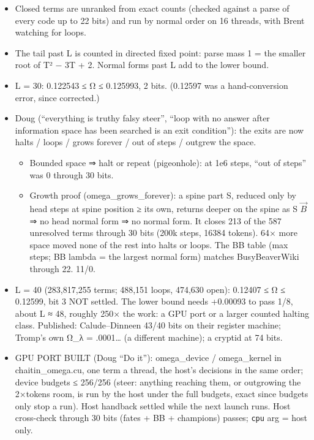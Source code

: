 \begin{enumerate}
\begin{itemize}
\begin{itemize}
\begin{itemize}
\item Closed terms are unranked from exact counts (checked against a parse of every code up to 22 bits) and run by normal order on 16 threads, with Brent watching for loops.
\item The tail past L is counted in directed fixed point: parse mass 1 = the smaller root of T² − 3T + 2. Normal forms past L add to the lower bound.
\item L = 30: 0.122543 ≤ Ω ≤ 0.125993, 2 bits. (0.12597 was a hand-conversion error, since corrected.)
\item Doug (“everything is truthy falsy steer”, “loop with no answer after information space has been searched is an exit condition”): the exits are now halts / loops / grows forever / out of steps / outgrew the space.

\begin{itemize}
\item Bounded space ⇒ halt or repeat (pigeonhole): at 1e6 steps, “out of steps” was 0 through 30 bits.
\item Growth proof (omega\_\allowbreak{}grows\_\allowbreak{}forever): a spine part S, reduced only by head steps at spine position ≥ its own, returns deeper on the spine as S \(\vec{B}\) ⇒ no head normal form ⇒ no normal form. It closes 213 of the 587 unresolved terms through 30 bits (200k steps, 16384 tokens). 64× more space moved none of the rest into halts or loops. The BB table (max steps; BB lambda = the largest normal form) matches BusyBeaverWiki through 22. 11/0.
\end{itemize}
\item L = 40 (283,817,255 terms; 488,151 loops, 474,630 open): 0.12407 ≤ Ω ≤ 0.12599, bit 3 NOT settled. The lower bound needs +0.00093 to pass 1/8, about L ≈ 48, roughly 250× the work: a GPU port or a larger counted halting class. Published: Calude–Dinneen 43/40 bits on their register machine; Tromp's own Ω\_\allowbreak{}λ = .0001… (a different machine); a cryptid at 74 bits.
\item GPU PORT BUILT (Doug “Do it”): omega\_\allowbreak{}device / omega\_\allowbreak{}kernel in chaitin\_\allowbreak{}omega.cu, one term a thread, the host's decisions in the same order; device budgets ≤ 256/256 (steer: anything reaching them, or outgrowing the 2×tokens room, is run by the host under the full budgets, exact since budgets only stop a run). Host handback settled while the next launch runs. Host cross-check through 30 bits (fates + BB + champions) passes; \texttt{cpu} arg = host only.


\end{itemize}
\end{itemize}
\end{itemize}
\end{enumerate}
